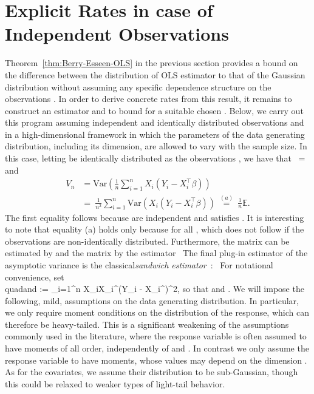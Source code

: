 \documentclass{article}
\begin{document}
\section{Explicit Rates in case of Independent Observations}
\label{section::explicit}
Theorem~\ref{thm:Berry-Esseen-OLS} in the previous section provides a bound on the difference between the distribution of OLS estimator to that of the Gaussian distribution without assuming any specific dependence structure on the observations  . In order to derive concrete rates from this result, it remains to construct an estimator   and to bound   for a suitable chosen  .
Below, we carry out this program assuming independent and identically distributed observations and in a high-dimensional framework in which the parameters of the data generating distribution, including its dimension, are allowed to vary with the sample size. In this case, letting   be identically distributed as the observations  , we have that
\ = 
\]
and
\begin{align*}
V_n &= \mbox{Var}\left(\frac{1}{n}\sum_{i=1}^n X_i(Y_i - X_i^{\top}\beta)\right)\\ ~&=~ \frac{1}{n^2}\sum_{i=1}^n \mbox{Var}(X_i(Y_i - X_i^{\top}\beta)) ~\overset{(a)}{=}~ \frac{1}{n}\mathbb{E}.
\end{align*}
The first equality follows because   are independent and   satisfies  . It is interesting to note that equality (a) holds only because   for all  , which does not follow if the observations are non-identically distributed.
Furthermore,
the matrix   can be estimated by   and the matrix   by the estimator
\ The final plug-in estimator of the
asymptotic variance   is the classical{\em sandwich estimator}~\citep{White1980,Buja14}:
\ For notational convenience, set
\\quad\mbox{and}\quad {} := \sum_{i=1}^n X_iX_i^{\top}(Y_i - X_i^{\top}\widehat{\beta})^2,
\]
so that   and  .
We will impose the following, mild, assumptions on the data generating distribution. In particular, we only require moment conditions
on the distribution of the response, which can therefore be heavy-tailed. This is a significant weakening of the assumptions commonly used in the literature, where the response variable is often assumed to have moments of all order, independently of   and  . In contrast we only assume the response variable to have   moments, whose values may depend on the dimension  .
As for the covariates,
we assume
their distribution to be sub-Gaussian, though this could be
relaxed to weaker types of light-tail behavior.
\end{document}
